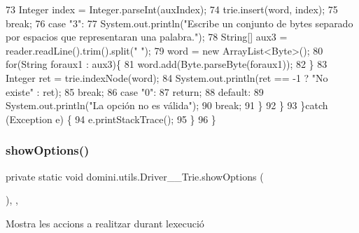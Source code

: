 \begin{DoxyCode}
73                     Integer index = Integer.parseInt(auxIndex);
74                     trie.insert(word, index);
75                 \textcolor{keywordflow}{break};
76                 \textcolor{keywordflow}{case} \textcolor{stringliteral}{"3"}:
77                     System.out.println(\textcolor{stringliteral}{"Escribe un conjunto de bytes separado por espacios que
       representaran una palabra."});
78                     String[] aux3 = reader.readLine().trim().split(\textcolor{stringliteral}{" "});
79                     word = \textcolor{keyword}{new} ArrayList<Byte>();
80                     \textcolor{keywordflow}{for}(String foraux1 : aux3)\{
81                         word.add(Byte.parseByte(foraux1));
82                     \}
83                     Integer ret = trie.indexNode(word);
84                     System.out.println(ret == -1 ? \textcolor{stringliteral}{"No existe"} : ret);
85                 \textcolor{keywordflow}{break};
86                 \textcolor{keywordflow}{case} \textcolor{stringliteral}{"0"}:
87                     \textcolor{keywordflow}{return};
88                 \textcolor{keywordflow}{default}:
89                     System.out.println(\textcolor{stringliteral}{"La opción no es válida"});
90                 \textcolor{keywordflow}{break};
91             \}
92         \}
93     \}\textcolor{keywordflow}{catch} (Exception e) \{
94         e.printStackTrace();
95     \}
96     \}
\end{DoxyCode}
\mbox{\label{classdomini_1_1utils_1_1Driver____Trie_a8b61698744500c2c6ffa92f861162ff5}} 
\subsubsection{\texorpdfstring{show\+Options()}{showOptions()}}
{\footnotesize\ttfamily private static void domini.\+utils.\+Driver\+\_\+\+\_\+\+Trie.\+show\+Options (\begin{DoxyParamCaption}{ }\end{DoxyParamCaption})\hspace{0.3cm}{\ttfamily [inline]}, {\ttfamily [static]}, {\ttfamily [private]}}



Mostra les accions a realitzar durant l\textquotesingle{}execució 


